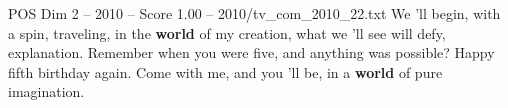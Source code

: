 \begin{textsample}{POS Dim 2 – 2010 – Score 1.00 – 2010/tv\_com\_2010\_22.txt}  \label{ex:f2_pos_049}
We 'll begin, with a spin, traveling, in the \textbf{world} of my creation, what we 'll see will defy, explanation.
Remember when you were five, and anything was possible?
Happy fifth birthday again.
Come with me, and you 'll be, in a \textbf{world} of pure imagination.

\end{textsample}
